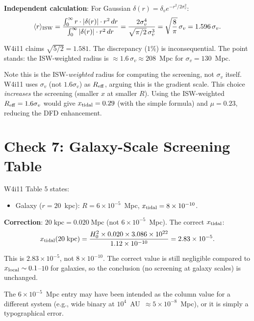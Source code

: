\documentclass[11pt,a4paper]{article}
\newcounter{findingctr}
\newenvironment{finding}[1][]{%
  \refstepcounter{findingctr}%
  \begin{tcolorbox}[colback=blue!3!white, colframe=blue!50!black,
    title=\textbf{Finding \thefindingctr: #1}]
}{%
  \end{tcolorbox}%
}
\newcommand{\ee}[1]{\times 10^{#1}}
\newcommand{\Hzero}{H_0}
\newcommand{\mufd}{\mu}
\begin{document}
\textbf{Independent calculation}: For Gaussian $\delta(r) = \delta_v
e^{-r^2/2\sigma_v^2}$:
\begin{equation}
\langle r\rangle_{\rm ISW} = \frac{\int_0^\infty r \cdot |\delta(r)|
\cdot r^2\,dr}{\int_0^\infty |\delta(r)| \cdot r^2\,dr}
= \frac{2\sigma_v^4}{\sqrt{\pi/2}\,\sigma_v^3}
= \sqrt{\frac{8}{\pi}}\,\sigma_v = 1.596\,\sigma_v.
\end{equation}

W4i11 claims $\sqrt{5/2} = 1.581$. The discrepancy ($1\%$) is
inconsequential. The point stands: the ISW-weighted radius is
$\approx 1.6\,\sigma_v \approx 208$~Mpc for $\sigma_v = 130$~Mpc.

Note this is the ISW-\emph{weighted} radius for computing the
screening, not $\sigma_v$ itself. W4i11 uses $\sigma_v$ (not
$1.6\sigma_v$) as $R_{\rm eff}$, arguing this is the gradient
scale. This choice \emph{increases} the screening (smaller $x$
at smaller $R$). Using the ISW-weighted $R_{\rm eff} = 1.6\sigma_v$
would give $x_{\rm tidal} = 0.29$ (with the simple formula) and
$\mufd = 0.23$, reducing the DFD enhancement.


\section{Check 7: Galaxy-Scale Screening Table}
\label{sec:check7}

\begin{finding}[\textbf{MINOR}: Unit Errors in Galaxy-Scale Table]
\label{find:table-errors}

W4i11 Table 5 states:
\begin{itemize}[nosep]
\item Galaxy ($r = 20$~kpc): $R = 6\ee{-5}$~Mpc,
  $x_{\rm tidal} = 8\ee{-10}$.
\end{itemize}

\textbf{Correction}: $20\;\text{kpc} = 0.020\;\text{Mpc}$ (not
$6\ee{-5}$~Mpc). The correct $x_{\rm tidal}$:
\begin{equation}
x_{\rm tidal}(20\;\text{kpc}) = \frac{\Hzero^2 \times
0.020 \times 3.086\ee{22}}{1.12\ee{-10}} = 2.83\ee{-5}.
\end{equation}

This is $2.83\ee{-5}$, not $8\ee{-10}$. The correct value is still
negligible compared to $x_{\rm local} \sim 0.1$--$10$ for galaxies,
so the conclusion (no screening at galaxy scales) is unchanged.

The $6\ee{-5}$~Mpc entry may have been intended as the column value
for a different system (e.g., wide binary at $10^4$~AU~$\approx
5\ee{-8}$~Mpc), or it is simply a typographical error.
\end{finding}
\end{document}
